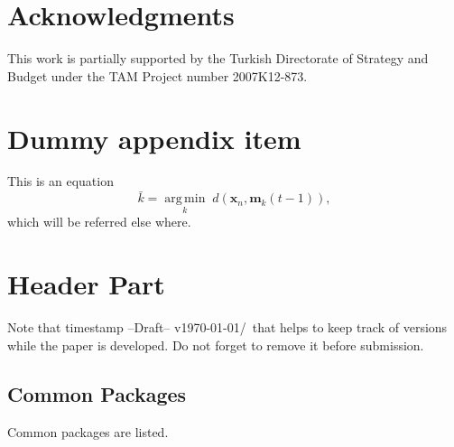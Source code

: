 \documentclass[10pt,journal,compsoc]{IEEEtran}
\newcommand{\hbTimeStamp}{{\color{red}--Draft-- v\today/\currenttime}} %
\newcommand{\hArgmin}[2]{\underset{#1}{\operatorname{arg \, min}}\;#2}
\theoremstyle{plain}
\theoremstyle{definition}
\theoremstyle{remark}
\begin{document}
\section*{Acknowledgments}

This work is partially supported by 
the Turkish Directorate of Strategy and Budget
under the TAM Project number 2007K12-873.





\appendix
\newcommand{\hbAppendixPrefix}{A}
%
\renewcommand{\thefigure}{\hbAppendixPrefix\arabic{figure}}
\setcounter{figure}{0}
\renewcommand{\thetable}{\hbAppendixPrefix\arabic{table}} 
\setcounter{table}{0}
\renewcommand{\theequation}{\hbAppendixPrefix\arabic{equation}} 
\setcounter{equation}{0}




\section{Dummy appendix item}
	\label{sec:dummyAppendix}


This is an equation
\begin{equation}
	\label{eq:equationInAppendix}
	\bar{k} = \hArgmin{k} d(\mathbf{x}_{n},  \mathbf{m}_{k}(t-1)),
\end{equation}
which will be referred else where.




\section{Header Part}

Note that timestamp \hbTimeStamp\ that helps to keep track of versions while the paper is developed.
Do not forget to remove it before submission.





\subsection{Common Packages}

Common packages are listed.
\end{document}
